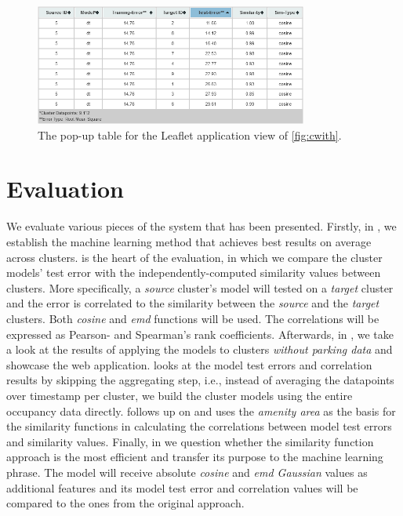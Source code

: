 \documentclass{ws-ijait}
\newcommand{\cmmnt}[1]{\ignorespaces}
\begin{document}
	\begin{figure}[!ht]
		\centering
		\includegraphics[width=0.8\textwidth]{../graphics/cwith_source_dt_cosine_table.png}
		\caption{The pop-up table for the Leaflet application view of \cref{fig:cwith}.}
		\label{fig:cwith_table}
	\end{figure}
	
	\section{Evaluation}
	We evaluate various pieces of the system that has been presented. Firstly, in \cmmnt{\cref{evaluation:best_model}}, we  establish the machine learning method that achieves best results on average across clusters. \cmmnt{\Cref{evaluation:similarity_vs_estimation_sec}} is the heart of the evaluation, in which we compare the cluster models' test error with the independently-computed similarity values between clusters. More specifically, a \textit{source} cluster's model will tested on a \textit{target} cluster and the error is correlated to the similarity between the \textit{source} and the \textit{target} clusters. Both \textit{cosine} and \textit{emd} functions will be used. The correlations will be expressed as Pearson- and Spearman's rank coefficients. Afterwards, in \cmmnt{\cref{evaluation:estimations_cwout}}, we take a look at the results of applying the models to clusters \textit{without parking data} and showcase the web application. \cmmnt{\Cref{evaluation:entire_datapoints}} looks at the model test errors and correlation results by skipping the aggregating step, i.e., instead of averaging the datapoints over timestamp per cluster, we build the cluster models using the entire occupancy data directly. \cmmnt{\Cref{evaluation:amenity_area}} follows up on \cmmnt{\cref{experimental_setup:amenity_area}} and uses the \textit{amenity area} as the basis for the similarity functions in calculating the correlations between model test errors and similarity values. Finally, in \cmmnt{\cref{evaluation:machine_learning_better}} we question whether the similarity function approach is the most efficient and transfer its purpose to the machine learning phrase. The model will receive absolute \textit{cosine} and \textit{emd Gaussian} values as additional features and its model test error and correlation values will be compared to the ones from the original approach.
	
\end{document}
